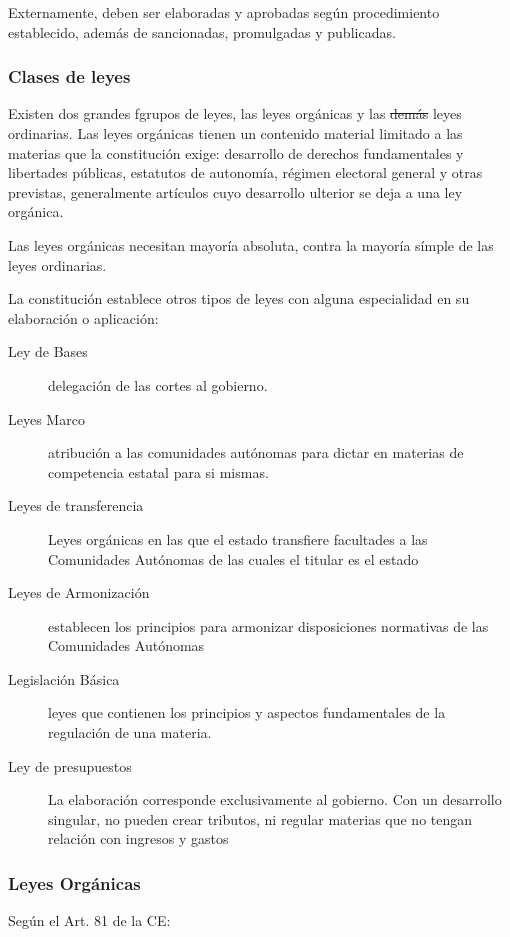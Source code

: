         Externamente, deben ser elaboradas y aprobadas según procedimiento establecido, además de sancionadas, promulgadas y publicadas.
    
    \subsubsection{Clases de leyes}
        Existen dos grandes fgrupos de leyes, las leyes orgánicas y las \st{demás} leyes ordinarias. Las leyes orgánicas tienen un contenido material limitado a las materias que la constitución exige: desarrollo de derechos fundamentales y libertades públicas, estatutos de autonomía, régimen electoral general y otras previstas, generalmente artículos cuyo desarrollo ulterior se deja a una ley orgánica.

        Las leyes orgánicas necesitan mayoría absoluta, contra la mayoría símple de las leyes ordinarias.

        La constitución establece otros tipos de leyes con alguna especialidad en su elaboración o aplicación:
        \begin{description}
            \item[Ley de Bases]delegación de las cortes al gobierno.
            \item[Leyes Marco] atribución a las comunidades autónomas para dictar en materias de competencia estatal para si mismas.
            \item[Leyes de transferencia] Leyes orgánicas en las que el estado transfiere facultades a las Comunidades Autónomas de las cuales el titular es el estado
            \item[Leyes de Armonización] establecen los principios para armonizar disposiciones normativas de las Comunidades Autónomas
            \item[Legislación Básica] leyes que contienen los principios y aspectos fundamentales de la regulación de una materia.
            \item[Ley de presupuestos] La elaboración corresponde exclusivamente al gobierno. Con un desarrollo singular, no pueden crear tributos, ni regular materias que no tengan relación con ingresos y gastos
        \end{description}

    \subsubsection{Leyes Orgánicas}
        Según el Art. 81 de la CE:
        \newline\noindent{}

